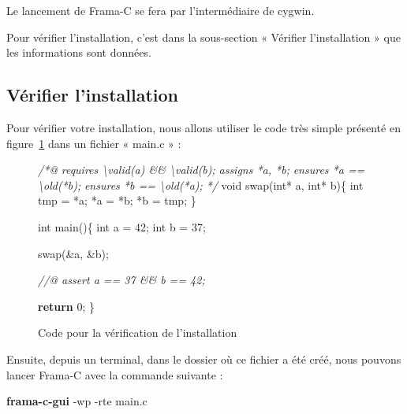 \documentclass[12pt,francais,]{scrbook}
\newenvironment{Shaded}{}{}
\newcommand{\KeywordTok}[1]{\textcolor[rgb]{0.00,0.44,0.13}{\textbf{{#1}}}}
\newcommand{\DataTypeTok}[1]{\textcolor[rgb]{0.56,0.13,0.00}{{#1}}}
\newcommand{\DecValTok}[1]{\textcolor[rgb]{0.25,0.63,0.44}{{#1}}}
\newcommand{\CommentTok}[1]{\textcolor[rgb]{0.38,0.63,0.69}{\textit{{#1}}}}
\newcommand{\NormalTok}[1]{{#1}}
\begin{document}
Le lancement de Frama-C se fera par l'intermédiaire de cygwin.

Pour vérifier l'installation, c'est dans la sous-section « Vérifier
l'installation » que les informations sont données.

\subsection{Vérifier l'installation}\label{vuxe9rifier-linstallation}

Pour vérifier votre installation, nous allons utiliser le code très
simple présenté en figure~\ref{fig:2-2-3-simple} dans un fichier « main.c » :

\begin{figure}
  \centering
\begin{footnotesize}\begin{Shaded}
\begin{Highlighting}[]
\CommentTok{/*@}
\CommentTok{  requires \textbackslash{}valid(a) && \textbackslash{}valid(b);}
\CommentTok{  assigns *a, *b;}
\CommentTok{  ensures *a == \textbackslash{}old(*b);}
\CommentTok{  ensures *b == \textbackslash{}old(*a);}
\CommentTok{*/}
\DataTypeTok{void} \NormalTok{swap(}\DataTypeTok{int}\NormalTok{* a, }\DataTypeTok{int}\NormalTok{* b)\{}
  \DataTypeTok{int} \NormalTok{tmp = *a;}
  \NormalTok{*a = *b;}
  \NormalTok{*b = tmp;}
\NormalTok{\}}

\DataTypeTok{int} \NormalTok{main()\{}
  \DataTypeTok{int} \NormalTok{a = }\DecValTok{42}\NormalTok{;}
  \DataTypeTok{int} \NormalTok{b = }\DecValTok{37}\NormalTok{;}

  \NormalTok{swap(&a, &b);}

  \CommentTok{//@ assert a == 37 && b == 42;}

  \KeywordTok{return} \DecValTok{0}\NormalTok{;}
\NormalTok{\}}
\end{Highlighting}
\end{Shaded}\end{footnotesize}
\caption{Code pour la vérification de l'installation}
\label{fig:2-2-3-simple}
\end{figure}

Ensuite, depuis un terminal, dans le dossier où ce fichier a été créé,
nous pouvons lancer Frama-C avec la commande suivante :

\begin{footnotesize}\begin{Shaded}
\begin{Highlighting}[]
\KeywordTok{frama-c-gui} \NormalTok{-wp -rte main.c}
\end{Highlighting}
\end{Shaded}\end{footnotesize}
\end{document}
